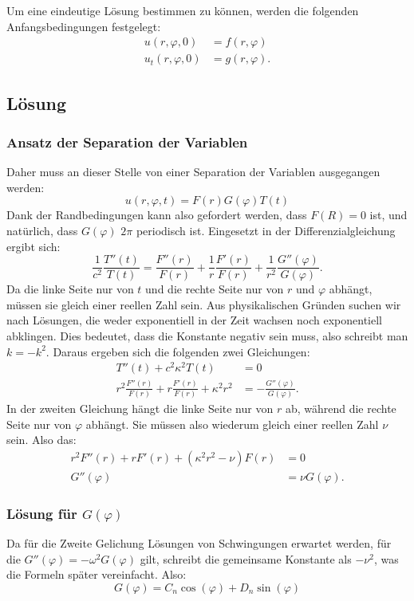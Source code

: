 Um eine eindeutige Lösung bestimmen zu können, werden die folgenden Anfangsbedingungen festgelegt:
\begin{align*}
	u(r,\varphi, 0) &= f(r,\varphi)\\
	u_t(r,\varphi, 0) &= g(r,\varphi).
\end{align*}

\subsection{Lösung\label{sub:lösung1}}
\subsubsection{Ansatz der Separation der Variablen\label{subsub:ansatz_separation}}
Daher muss an dieser Stelle von einer Separation der Variablen ausgegangen werden:
\begin{equation*}
	u(r,\varphi, t) = F(r)G(\varphi)T(t)
\end{equation*}
Dank der Randbedingungen kann also gefordert werden, dass $F(R)=0$ ist, und natürlich, dass $G(\varphi)$ $2\pi$ periodisch ist. Eingesetzt in der Differenzialgleichung ergibt sich:
\begin{equation*}
	\frac{1}{c^2}\frac{T''(t)}{T(t)}=\frac{F''(r)}{F(r)}+\frac{1}{r}\frac{F'(r)}{F(r)}+\frac{1}{r^2}\frac{G''(\varphi)}{G(\varphi)}.
\end{equation*}
Da die linke Seite nur von $t$ und die rechte Seite nur von $r$ und $\varphi$ abhängt, müssen sie gleich einer reellen Zahl sein. Aus physikalischen Gründen suchen wir nach Lösungen, die weder exponentiell in der Zeit wachsen noch exponentiell abklingen. Dies bedeutet, dass die Konstante negativ sein muss, also schreibt man $k=-k^2$. Daraus ergeben sich die folgenden zwei Gleichungen:
\begin{align*}
	T''(t) + c^2\kappa^2T(t) &= 0\\
	r^2\frac{F''(r)}{F(r)} + r \frac{F'(r)}{F(r)} +\kappa^2 r^2 &= - \frac{G''(\varphi)}{G(\varphi)}.
\end{align*}
In der zweiten Gleichung hängt die linke Seite nur von $r$ ab, während die rechte Seite nur von $\varphi$ abhängt. Sie müssen also wiederum gleich einer reellen Zahl $\nu$ sein. Also das:
\begin{align*}
	r^2F''(r) + rF'(r) + (\kappa^2 r^2 - \nu)F(r) &= 0 \\
	G''(\varphi) &= \nu G(\varphi).
\end{align*}

\subsubsection{Lösung für $G(\varphi)$\label{subsub:lösung_G}}
Da für die Zweite Gelichung Lösungen von Schwingungen erwartet werden, für die $G''(\varphi)=-\omega^2 G(\varphi)$ gilt, schreibt die gemeinsame Konstante als $-\nu^2$, was die Formeln später vereinfacht. Also:
\begin{equation*}
 G(\varphi) = C_n \cos(\varphi) + D_n \sin(\varphi)
 \label{eq:cos_sin_überlagerung}
\end{equation*}


